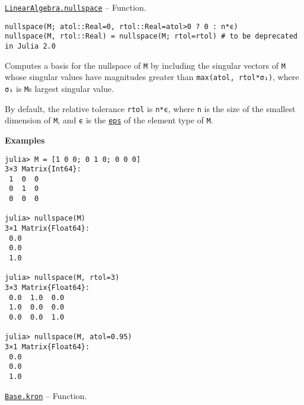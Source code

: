 \hypertarget{13997374044866220350}{}
\hyperlink{13997374044866220350}{\texttt{LinearAlgebra.nullspace}}  -- {Function.}

\begin{adjustwidth}{2em}{0pt}


\begin{verbatim}
nullspace(M; atol::Real=0, rtol::Real=atol>0 ? 0 : n*ϵ)
nullspace(M, rtol::Real) = nullspace(M; rtol=rtol) # to be deprecated in Julia 2.0
\end{verbatim}

Computes a basis for the nullspace of \texttt{M} by including the singular vectors of \texttt{M} whose singular values have magnitudes greater than \texttt{max(atol, rtol*σ₁)}, where \texttt{σ₁} is \texttt{M}{\textquotesingle}s largest singular value.

By default, the relative tolerance \texttt{rtol} is \texttt{n*ϵ}, where \texttt{n} is the size of the smallest dimension of \texttt{M}, and \texttt{ϵ} is the \hyperlink{11007691776383983215}{\texttt{eps}} of the element type of \texttt{M}.

\textbf{Examples}


\begin{verbatim}
julia> M = [1 0 0; 0 1 0; 0 0 0]
3×3 Matrix{Int64}:
 1  0  0
 0  1  0
 0  0  0

julia> nullspace(M)
3×1 Matrix{Float64}:
 0.0
 0.0
 1.0

julia> nullspace(M, rtol=3)
3×3 Matrix{Float64}:
 0.0  1.0  0.0
 1.0  0.0  0.0
 0.0  0.0  1.0

julia> nullspace(M, atol=0.95)
3×1 Matrix{Float64}:
 0.0
 0.0
 1.0
\end{verbatim}



\end{adjustwidth}
\hypertarget{14153417388267953812}{}
\hyperlink{14153417388267953812}{\texttt{Base.kron}}  -- {Function.}

